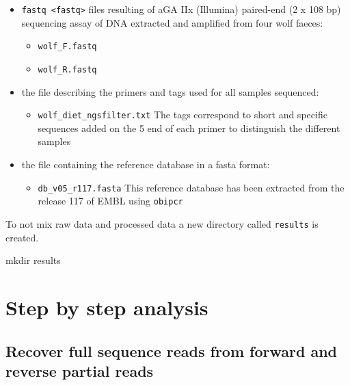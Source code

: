 \documentclass[
  letterpaper,
  DIV=11,
  numbers=noendperiod]{scrreprt}
\newenvironment{Shaded}{\begin{snugshade}}{\end{snugshade}}
\newcommand{\FunctionTok}[1]{\textcolor[rgb]{0.28,0.35,0.67}{#1}}
\newcommand{\NormalTok}[1]{\textcolor[rgb]{0.00,0.23,0.31}{#1}}
\providecommand{\tightlist}{%
  \setlength{\itemsep}{0pt}\setlength{\parskip}{0pt}}\usepackage{longtable,booktabs,array}
\begin{document}
\begin{itemize}
\item
  \texttt{fastq\ \textless{}fastq\textgreater{}} files resulting of aGA
  IIx (Illumina) paired-end (2 x 108 bp) sequencing assay of DNA
  extracted and amplified from four wolf faeces:

  \begin{itemize}
  \tightlist
  \item
    \texttt{wolf\_F.fastq}
  \item
    \texttt{wolf\_R.fastq}
  \end{itemize}
\item
  the file describing the primers and tags used for all samples
  sequenced:

  \begin{itemize}
  \tightlist
  \item
    \texttt{wolf\_diet\_ngsfilter.txt} The tags correspond to short and
    specific sequences added on the 5\textquotesingle{} end of each
    primer to distinguish the different samples
  \end{itemize}
\item
  the file containing the reference database in a fasta format:

  \begin{itemize}
  \tightlist
  \item
    \texttt{db\_v05\_r117.fasta} This reference database has been
    extracted from the release 117 of EMBL using \texttt{obipcr}
  \end{itemize}
\end{itemize}

To not mix raw data and processed data a new directory called
\texttt{results} is created.

\begin{Shaded}
\begin{Highlighting}[]
\FunctionTok{mkdir}\NormalTok{ results}
\end{Highlighting}
\end{Shaded}

\hypertarget{step-by-step-analysis}{%
\section{Step by step analysis}\label{step-by-step-analysis}}

\hypertarget{recover-full-sequence-reads-from-forward-and-reverse-partial-reads}{%
\subsection{Recover full sequence reads from forward and reverse partial
reads}\label{recover-full-sequence-reads-from-forward-and-reverse-partial-reads}}
\end{document}
